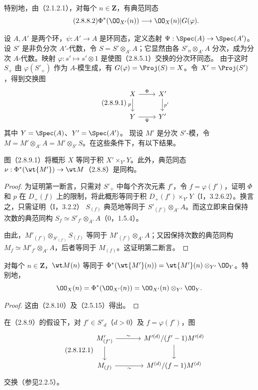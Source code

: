 特别地，由（2.1.2.1），对每个 $n\in\mathbf Z$，有典范同态
\begin{equation}\tag{2.8.8.2}
\Phi^*(\OO_{X'}(n))\longrightarrow\OO_X(n)|G(\varphi).
\end{equation}

设 $A,A'$ 是两个环，$\psi:A'\to A$ 是环同态，定义态射
$\Psi:\Spec(A)\to\Spec(A')$。设 $S'$ 是非负分次 $A'$-代数，令
$S=S'\otimes_{A'}A$；它显然由各 $S'_n\otimes_{A'}A$ 分次，成为分次 $A$-代数。映射
$\varphi:s'\mapsto s'\otimes1$ 是使图（2.8.5.1）交换的分次环同态。
由于这时 $S_+$ 由 $\varphi(S'_+)$ 作为 $A$-模生成，有
$G(\varphi)=\Proj(S)=X$。令 $X'=\Proj(S')$，得到交换图
\begin{equation}\tag{2.8.9.1}
\begin{tikzcd}
X \arrow[r,"\Phi"] \arrow[d,"p"'] & X' \arrow[d,"p'"]\\
Y \arrow[r,"\Psi"'] & Y'
\end{tikzcd}
\end{equation}
其中 $Y=\Spec(A)$、$Y'=\Spec(A')$。
现设 $M'$ 是分次 $S'$-模，令
$M=M'\otimes_{A'}A=M'\otimes_{S'}S$。在这些条件下，有以下结果。

图（2.8.9.1）将概形 $X$ 等同于积 $X'\times_{Y'}Y$。此外，典范同态
$\nu:\Phi^*(\wt{M'})\to\wt M$（2.8.8）是同构。
\begin{proof}
为证明第一断言，只需对 $S'_+$ 中每个齐次元素 $f'$，令 $f=\varphi(f')$，证明
$\Phi$ 和 $p$ 在 $D_+(f)$ 上的限制，将此概形等同于积
$D_+(f')\times_{Y'}Y$（I，3.2.6.2）。换言之，只需证明（I，3.2.2）
$S_{(f)}$ 典范地等同于 $S'_{(f')}\otimes_{A'}A$。而这立即来自保持次数的典范同构
$S_f\simeq S'_{f'}\otimes_{A'}A$（0，1.5.4）。

由此，$M'_{(f')}\otimes_{S'_{(f')}}S_{(f)}$ 等同于
$M'_{(f')}\otimes_{A'}A$；又因保持次数的典范同构
$M_f\simeq M'_{f'}\otimes_{A'}A$，后者等同于 $M_{(f)}$。这证明第二断言。
\end{proof}

对每个 $n\in\mathbf Z$，$\wt M(n)$ 等同于
$\Phi^*(\wt{M'}(n))=\wt{M'}(n)\otimes_{Y'}\OO_Y$。特别地，
\[
\OO_X(n)=\Phi^*(\OO_{X'}(n))=\OO_{X'}(n)\otimes_{Y'}\OO_Y.
\]
\begin{proof}
这由（2.8.10）及（2.5.15）得出。
\end{proof}

在（2.8.9）的假设下，对 $f'\in S'_d$（$d>0$）及 $f=\varphi(f')$，图
\begin{equation}\tag{2.8.12.1}
\begin{tikzcd}[column sep=large]
M'_{(f')} \arrow[r,"\sim"] \arrow[d] & M'^{(d)}/(f'-1)M'^{(d)} \arrow[d]\\
M_{(f)} \arrow[r,"\sim"'] & M^{(d)}/(f-1)M^{(d)}
\end{tikzcd}
\end{equation}
交换（参见2.2.5）。

